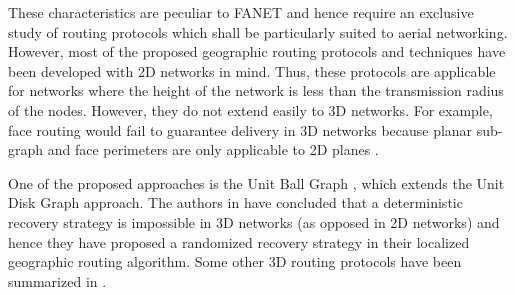 These characteristics are peculiar to FANET and hence require an exclusive study of routing protocols which shall be particularly suited to aerial networking. However, most of the proposed geographic routing protocols and techniques have been developed with 2D networks in mind. Thus, these protocols are applicable for networks where the height of the network is less than the transmission radius of the nodes. However, they do not extend easily to 3D networks. For example, face routing would fail to guarantee delivery in 3D networks because planar sub-graph and face perimeters are only applicable to 2D planes \cite{4721268}.

One of the proposed approaches is the Unit Ball Graph \cite{4509730}, which extends the Unit Disk Graph approach. The authors in \cite{4509730} \cite{Durocher2010} have concluded that a deterministic recovery strategy is impossible in 3D networks (as opposed in 2D networks) and hence they have proposed a randomized recovery strategy in their localized geographic routing algorithm. Some other 3D routing protocols have been summarized in \cite{BEKMEZCI20131254} \cite{7437029}.
